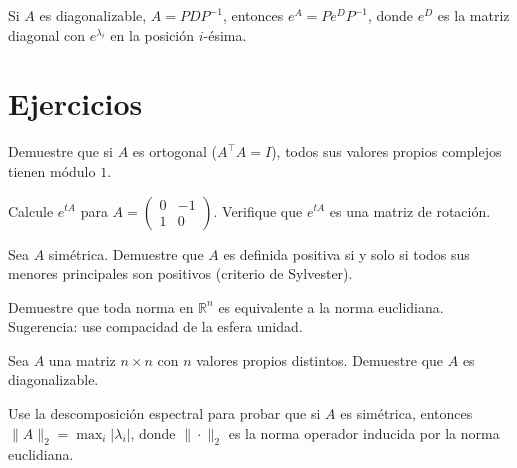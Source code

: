 \begin{example}
Si $A$ es diagonalizable, $A=PDP^{-1}$, entonces $e^{A}=Pe^{D}P^{-1}$, donde $e^{D}$ es la matriz diagonal con $e^{\lambda_i}$ en la posición $i$-ésima.
\end{example}

\section{Ejercicios}

\begin{exercise}
Demuestre que si $A$ es ortogonal ($A^{\top}A=I$), todos sus valores propios complejos tienen módulo $1$.
\end{exercise}

\begin{exercise}
Calcule $e^{tA}$ para $A=\begin{pmatrix}0&-1\\1&0\end{pmatrix}$. Verifique que $e^{tA}$ es una matriz de rotación.
\end{exercise}

\begin{exercise}
Sea $A$ simétrica. Demuestre que $A$ es definida positiva si y solo si todos sus menores principales son positivos (criterio de Sylvester).
\end{exercise}

\begin{exercise}
Demuestre que toda norma en $\mathbb{R}^n$ es equivalente a la norma euclidiana. Sugerencia: use compacidad de la esfera unidad.
\end{exercise}

\begin{exercise}
Sea $A$ una matriz $n\times n$ con $n$ valores propios distintos. Demuestre que $A$ es diagonalizable.
\end{exercise}

\begin{exercise}
Use la descomposición espectral para probar que si $A$ es simétrica, entonces $\|A\|_2=\max_i|\lambda_i|$, donde $\|\cdot\|_2$ es la norma operador inducida por la norma euclidiana.
\end{exercise}
